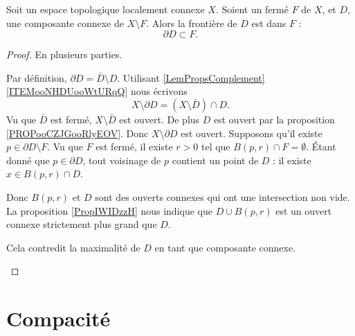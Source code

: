 \begin{lemma}     \label{LEMooWGOCooHSoCzb}
	Soit un espace topologique localement connexe \( X\). Soient un fermé \( F\) de \( X\), et \( D\), une composante connexe de \( X\setminus F\). Alors la frontière de \( D\) est dans \( F\) :
	\begin{equation}
		\partial D\subset F.
	\end{equation}
\end{lemma}

\begin{proof}
	En plusieurs parties.
	\begin{subproof}
		Par définition, \( \partial D=\bar D\setminus D\). Utilisant \ref{LemPropsComplement}\ref{ITEMooNHDUooWtURqQ} nous écrivons
		\begin{equation}
			X\setminus \partial D=(X\setminus \bar D)\cap D.
		\end{equation}
		Vu que \( \bar D\) est fermé, \( X\setminus \bar D\) est ouvert. De plus \( D\) est ouvert par la proposition \ref{PROPooCZJGooRlyEOV}. Donc \( X\setminus\partial D\) est ouvert.
		Supposons qu'il existe \( p\in\partial D\setminus F\). Vu que \( F\) est fermé, il existe \( r>0\) tel que \( B(p,r)\cap F=\emptyset\). Étant donné que \( p\in\partial D\), tout voisinage de \( p\) contient un point de \( D\) : il existe \( x\in B(p,r)\cap D\).

		Donc \( B(p,r)\) et \( D\) sont des ouverts connexes qui ont une intersection non vide. La proposition \ref{PropIWIDzzH} nous indique que \( D\cup B(p,r)\) est un ouvert connexe strictement plus grand que \( D\).

		Cela contredit la maximalité de \( D\) en tant que composante connexe.
	\end{subproof}
\end{proof}

\section{Compacité}

